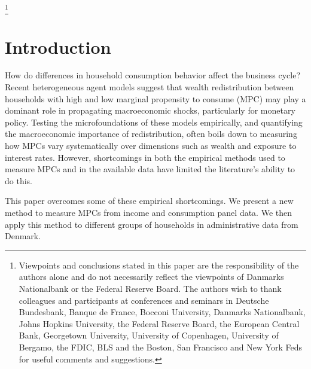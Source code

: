 \documentclass[titlepage]{\econtex}\newcommand{\texname}{ConsumptionHeterogeneity}
\begin{document}
\begin{authorsinfo}
\end{authorsinfo}
\thanks{Viewpoints and conclusions stated in this paper are the responsibility of the authors alone and do not necessarily reflect the viewpoints of Danmarks Nationalbank or the Federal Reserve Board. The authors wish to thank colleagues and participants at conferences and seminars in Deutsche Bundesbank, Banque de France, Bocconi University, Danmarks Nationalbank, Johns Hopkins University, the Federal Reserve Board, the European Central Bank, Georgetown University, University of Copenhagen, University of Bergamo, the FDIC, BLS and the Boston, San Francisco and New York Feds for useful comments and suggestions.}

\titlepagefinish
\setcounter{page}{1}

\pagebreak
\section{Introduction}
How do differences in household consumption behavior affect the business cycle? Recent heterogeneous agent models suggest that wealth redistribution between households with high and low marginal propensity to consume (MPC) may play a dominant role in propagating macroeconomic shocks, particularly for monetary policy. Testing the microfoundations of these models empirically, and quantifying the macroeconomic importance of redistribution, often boils down to measuring how MPCs vary systematically over dimensions such as wealth and exposure to interest rates. However, shortcomings in both the empirical methods used to measure MPCs and in the available data have limited the literature's ability to do this.

This paper overcomes some of these empirical shortcomings. We present a new method to measure MPCs from income and consumption panel data. We then apply this method to different groups of households in administrative data from Denmark.
\end{document}

